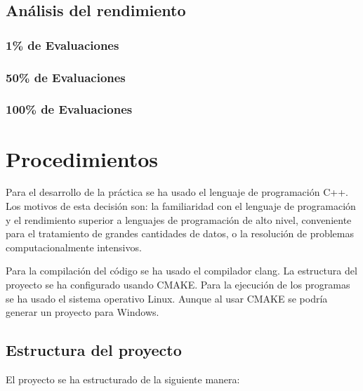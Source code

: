 \documentclass[a4paper, 12.5pt]{report}
\begin{document}
\subsection{Análisis del rendimiento}

\subsubsection{1\% de Evaluaciones}

\subsubsection{50\% de Evaluaciones}

\subsubsection{100\% de Evaluaciones}


\section{Procedimientos}

Para el desarrollo de la práctica se ha usado el lenguaje de programación C++. Los motivos de esta decisión son: la familiaridad con el lenguaje de programación y el rendimiento superior a lenguajes de programación de alto nivel, conveniente para el tratamiento de grandes cantidades de datos, o la resolución de problemas computacionalmente intensivos.

Para la compilación del código se ha usado el compilador clang. La estructura del proyecto se ha configurado usando CMAKE. Para la ejecución de los programas se ha usado el sistema operativo Linux. Aunque al usar CMAKE se podría generar un proyecto para Windows.

\subsection{Estructura del proyecto}

El proyecto se ha estructurado de la siguiente manera:


\end{document}
